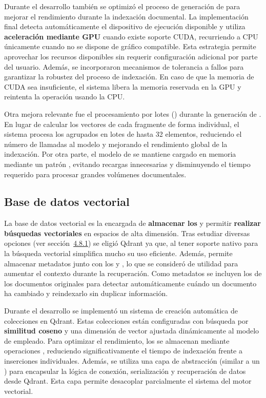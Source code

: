 Durante el desarrollo también se optimizó el proceso de generación de  para mejorar el rendimiento durante la indexación documental. La implementación final detecta automáticamente el dispositivo de ejecución disponible y utiliza \textbf{aceleración mediante GPU} cuando existe soporte CUDA, recurriendo a CPU únicamente cuando no se dispone de  gráfico compatible. Esta estrategia permite aprovechar los recursos disponibles sin requerir configuración adicional por parte del usuario. Además, se incorporaron mecanismos de tolerancia a fallos para garantizar la robustez del proceso de indexación. En caso de que la memoria de CUDA sea insuficiente, el sistema libera la memoria reservada en la GPU y reintenta la operación usando la CPU.

Otra mejora relevante fue el procesamiento por lotes () durante la generación de . En lugar de calcular los vectores de cada fragmente de forma individual, el sistema procesa los  agrupados en lotes de hasta 32 elementos, reduciendo el número de llamadas al modelo y mejorando el rendimiento global de la indexación. Por otra parte, el modelo de  se mantiene cargado en memoria mediante un patrón , evitando recargas innecesarias y disminuyendo el tiempo requerido para procesar grandes volúmenes documentales.

\subsection{Base de datos vectorial}

La base de datos vectorial es la encargada de \textbf{almacenar los } y permitir \textbf{realizar búsquedas vectoriales} en espacios de alta dimensión. Tras estudiar diversas opciones (ver sección~\hyperref[basedatos_vectorial]{4.8.1}) se eligió Qdrant ya que, al tener soporte nativo para la búsqueda vectorial simplifica mucho su uso eficiente. Además, permite almacenar metadatos junto con los  y , lo que se consideró de utilidad para aumentar el contexto durante la recuperación. Como metadatos se incluyen los  de los documentos originales para detectar automáticamente cuándo un documento ha cambiado y reindexarlo sin duplicar información.

Durante el desarrollo se implementó un sistema de creación automática de colecciones en Qdrant. Estas colecciones están configuradas con búsqueda por \textbf{similitud coseno} y una dimensión de vector ajustada dinámicamente al modelo de  empleado. Para optimizar el rendimiento, los  se almacenan mediante operaciones , reduciendo significativamente el tiempo de indexación frente a inserciones individuales. Además, se utiliza una capa de abstracción (similar a un ) para encapsular la lógica de conexión, serialización y recuperación de datos desde Qdrant. Esta capa permite desacoplar parcialmente el sistema del motor vectorial.

